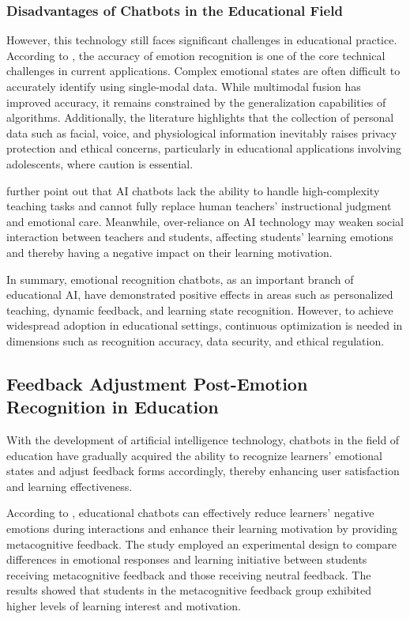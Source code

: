 \documentclass{xum_review}
\begin{document}
\subsubsection{Disadvantages of Chatbots in the Educational Field}

However, this technology still faces significant challenges in educational
practice. According to \citet{arsad2024integrating}, the accuracy of emotion recognition
is one of the core technical challenges in current applications. Complex
emotional states are often difficult to accurately identify using single-modal
data. While multimodal fusion has improved accuracy, it remains constrained by
the generalization capabilities of algorithms. Additionally, the literature
highlights that the collection of personal data such as facial, voice, and
physiological information inevitably raises privacy protection and ethical
concerns, particularly in educational applications involving adolescents, where
caution is essential. 

\citet{siregar2024ai} further point out that AI chatbots lack the ability to
handle high-complexity teaching tasks and cannot fully replace human teachers'
instructional judgment and emotional care. Meanwhile, over-reliance on AI
technology may weaken social interaction between teachers and students,
affecting students' learning emotions and thereby having a negative impact on
their learning motivation. 

In summary, emotional recognition chatbots, as an important branch of
educational AI, have demonstrated positive effects in areas such as personalized
teaching, dynamic feedback, and learning state recognition. However, to achieve
widespread adoption in educational settings, continuous optimization is needed
in dimensions such as recognition accuracy, data security, and ethical
regulation. 

\subsection{Feedback Adjustment Post-Emotion Recognition in Education}
With the development of artificial intelligence technology, chatbots in the
field of education have gradually acquired the ability to recognize learners'
emotional states and adjust feedback forms accordingly, thereby enhancing user
satisfaction and learning effectiveness. 

According to \citet{yin2024effects}, educational chatbots
can effectively reduce learners' negative emotions during interactions and
enhance their learning motivation by providing metacognitive feedback. The study
employed an experimental design to compare differences in emotional responses
and learning initiative between students receiving metacognitive feedback and
those receiving neutral feedback. The results showed that students in the
metacognitive feedback group exhibited higher levels of learning interest and
motivation. 
\end{document}
